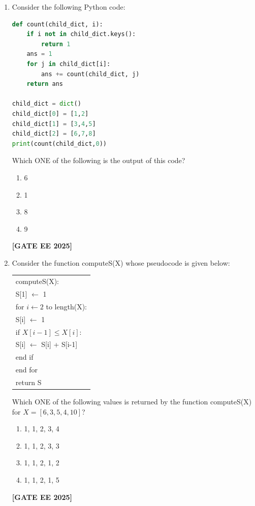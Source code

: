 \documentclass[journal]{IEEEtran}
\newcommand{\qfooter}{%
  \begin{flushright}\footnotesize\textbf{[GATE EE 2025]}\end{flushright}\vspace{1em}%
}
\begin{document}
\begin{enumerate}
\item Consider the following Python code:
\begin{lstlisting}[language=Python]
def count(child_dict, i):
    if i not in child_dict.keys():
        return 1
    ans = 1
    for j in child_dict[i]:
        ans += count(child_dict, j)
    return ans

child_dict = dict()
child_dict[0] = [1,2]
child_dict[1] = [3,4,5]
child_dict[2] = [6,7,8]
print(count(child_dict,0))
\end{lstlisting}
Which ONE of the following is the output of this code?
\begin{multicols}{2}
\begin{enumerate}
\item 6
\item 1
\item 8
\item 9
\end{enumerate} \qfooter
\end{multicols}

\item Consider the function computeS(X) whose pseudocode is given below:

\begin{tabular}{l}
computeS(X):\\
\hspace{5mm}S[1] $\leftarrow$ 1\\
\hspace{5mm}for $i \leftarrow 2$ to length(X):\\
\hspace{10mm}S[i] $\leftarrow$ 1\\
\hspace{10mm}if $X[i-1] \le X[i]$:\\
\hspace{15mm}S[i] $\leftarrow$ S[i] + S[i-1]\\
\hspace{10mm}end if\\
\hspace{5mm}end for\\
\hspace{5mm}return S\\
\end{tabular}

Which ONE of the following values is returned by the function computeS(X) for $X = [6, 3, 5, 4, 10]$?
\begin{multicols}{2}
\begin{enumerate}
\item 1, 1, 2, 3, 4
\item 1, 1, 2, 3, 3
\item 1, 1, 2, 1, 2
\item 1, 1, 2, 1, 5
\end{enumerate} \qfooter
\end{multicols}


\end{enumerate}
\end{document}
